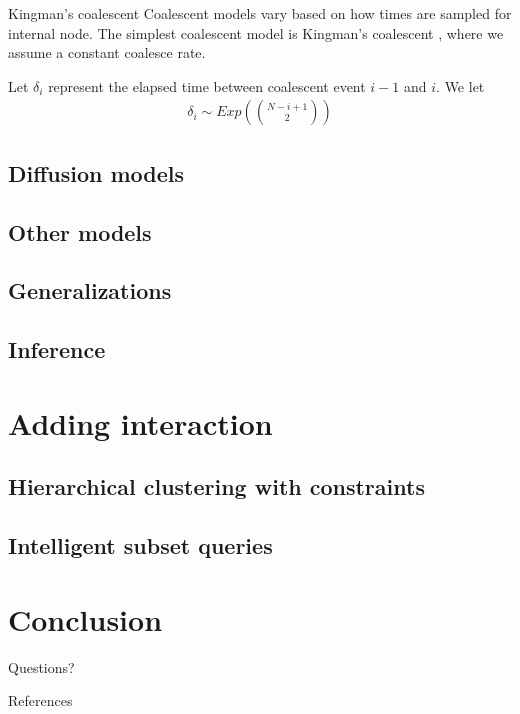 \documentclass[10pt, compress]{beamer}
\begin{document}
\begin{frame}{Kingman's coalescent}
  Coalescent models vary based on how times are sampled
  for internal node.
  The simplest coalescent model is \alert{Kingman's coalescent} \cite{Kingman1982},
  where we assume a constant coalesce rate.

  \pause

  Let $\delta_i$ represent the elapsed time
  between coalescent event $i-1$ and $i$.
  We let
  \begin{align}
    \delta_i \sim Exp\left(\binom{N - i + 1}{2}\right)
  \end{align}
\end{frame}
\subsection{Diffusion models}
\subsection{Other models}
\subsection{Generalizations}
\subsection{Inference}

\section{Adding interaction}

\subsection{Hierarchical clustering with constraints}
\subsection{Intelligent subset queries}

\section{Conclusion}

\begin{frame}[standout]
Questions?
\end{frame}

\begin{frame}[allowframebreaks]{References}
  
  
\end{frame}
\end{document}
